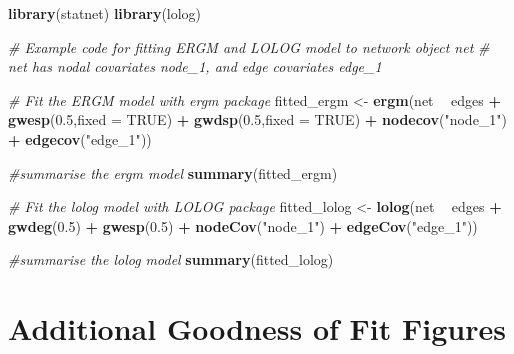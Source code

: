 \documentclass[
]{statsoc}
\newenvironment{Shaded}{\begin{snugshade}}{\end{snugshade}}
\newcommand{\CommentTok}[1]{\textcolor[rgb]{0.56,0.35,0.01}{\textit{#1}}}
\newcommand{\DataTypeTok}[1]{\textcolor[rgb]{0.13,0.29,0.53}{#1}}
\newcommand{\FloatTok}[1]{\textcolor[rgb]{0.00,0.00,0.81}{#1}}
\newcommand{\KeywordTok}[1]{\textcolor[rgb]{0.13,0.29,0.53}{\textbf{#1}}}
\newcommand{\NormalTok}[1]{#1}
\newcommand{\OperatorTok}[1]{\textcolor[rgb]{0.81,0.36,0.00}{\textbf{#1}}}
\newcommand{\OtherTok}[1]{\textcolor[rgb]{0.56,0.35,0.01}{#1}}
\newcommand{\StringTok}[1]{\textcolor[rgb]{0.31,0.60,0.02}{#1}}
\begin{document}
\begin{Shaded}
\begin{Highlighting}[]
\KeywordTok{library}\NormalTok{(statnet)}
\KeywordTok{library}\NormalTok{(lolog)}

\CommentTok{# Example code for fitting ERGM and LOLOG model to network object net}
\CommentTok{# net has nodal covariates node_1, and edge covariates edge_1}

\CommentTok{# Fit the ERGM model with ergm package}
\NormalTok{fitted_ergm <-}\StringTok{ }\KeywordTok{ergm}\NormalTok{(net }\OperatorTok{~}\StringTok{ }\NormalTok{edges }\OperatorTok{+}\StringTok{ }
\StringTok{                          }\KeywordTok{gwesp}\NormalTok{(}\FloatTok{0.5}\NormalTok{,}\DataTypeTok{fixed =} \OtherTok{TRUE}\NormalTok{) }\OperatorTok{+}\StringTok{ }
\StringTok{                          }\KeywordTok{gwdsp}\NormalTok{(}\FloatTok{0.5}\NormalTok{,}\DataTypeTok{fixed =} \OtherTok{TRUE}\NormalTok{) }\OperatorTok{+}
\StringTok{                          }\KeywordTok{nodecov}\NormalTok{(}\StringTok{"node_1"}\NormalTok{) }\OperatorTok{+}
\StringTok{                          }\KeywordTok{edgecov}\NormalTok{(}\StringTok{"edge_1"}\NormalTok{))}

\CommentTok{#summarise the ergm model}
\KeywordTok{summary}\NormalTok{(fitted_ergm)}

\CommentTok{# Fit the lolog model with LOLOG package}
\NormalTok{fitted_lolog <-}\StringTok{ }\KeywordTok{lolog}\NormalTok{(net }\OperatorTok{~}\StringTok{ }\NormalTok{edges }\OperatorTok{+}\StringTok{ }
\StringTok{                            }\KeywordTok{gwdeg}\NormalTok{(}\FloatTok{0.5}\NormalTok{) }\OperatorTok{+}
\StringTok{                            }\KeywordTok{gwesp}\NormalTok{(}\FloatTok{0.5}\NormalTok{) }\OperatorTok{+}\StringTok{ }
\StringTok{                            }\KeywordTok{nodeCov}\NormalTok{(}\StringTok{"node_1"}\NormalTok{) }\OperatorTok{+}\StringTok{ }
\StringTok{                            }\KeywordTok{edgeCov}\NormalTok{(}\StringTok{"edge_1"}\NormalTok{))}

\CommentTok{#summarise the lolog model}
\KeywordTok{summary}\NormalTok{(fitted_lolog)}
\end{Highlighting}
\end{Shaded}

\section{Additional Goodness of Fit Figures}\label{app:GOF}
\end{document}
